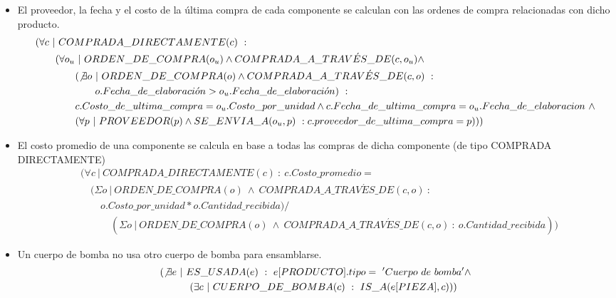 \documentclass[]{report}
\begin{document}
\begin{itemize}
		\item El proveedor, la fecha y el costo de la última compra de cada componente se calculan con las ordenes de compra relacionadas con dicho producto.
		\begin{align*}
		&(\forall c\ |\ COMPRADA\_DIRECTAMENTE(c)\ :\\
		&\hspace{2em} (\forall o_u\ |\ ORDEN\_DE\_COMPRA(o_u) \land  COMPRADA\_A\_TRAV\acute{E}S\_DE(c,o_u) \land\ \\
		&\hspace{4em} (\not \exists o\  |\ ORDEN\_DE\_COMPRA(o) \land  COMPRADA\_A\_TRAV\acute{E}S\_DE(c,o)\ :\\
		&\hspace{6em}o.Fecha\_de\_elaboraci\acute{o}n > o_u.Fecha\_de\_elaboraci\acute{o}n)\ :\\
		&\hspace{4em} c.Costo\_de\_ultima\_compra = o_u.Costo\_por\_unidad \land c.Fecha\_de\_ultima\_compra = o_u.Fecha\_de\_elaboracion\ \land \\
		&\hspace{4em} (\forall p\ |\ PROVEEDOR(p) \land SE\_ENVIA\_A(o_u,p)\ : c.proveedor\_de\_ultima\_compra = p)
		))
		\end{align*}
		
		\item El costo promedio de una componente se calcula en base a todas las compras de dicha componente (de tipo COMPRADA DIRECTAMENTE)
		\begin{align*}
		&(\forall c\ |\ COMPRADA\_DIRECTAMENTE(c)\ :\ c.Costo\_promedio =\\
		&\hspace{1em} (\Sigma o\ |\ ORDEN\_DE\_COMPRA(o)\ \land\ COMPRADA\_A\_TRAV\acute{E}S\_DE(c,o)\ : \\
		& \hspace{2em} o.Costo\_por\_unidad*o.Cantidad\_recibida)/\\
		& \hspace{3em} (\Sigma o\ |\ ORDEN\_DE\_COMPRA(o)\ \land\ COMPRADA\_A\_TRAV\acute{E}S\_DE(c,o)\ :\ o.Cantidad\_recibida))
		\end{align*}
		
		
		\item Un cuerpo de bomba no usa otro cuerpo de bomba para ensamblarse.
		\begin{align*}
		&(\not \exists e\ |\ ES\_USADA(e)\ :\ e[PRODUCTO].tipo =\ 'Cuerpo\ de\ bomba' \land \\
		&\hspace{3em}(\exists c\ |\ CUERPO\_DE\_BOMBA(c)\ :\ IS\_A(e[PIEZA], c)))
		\end{align*}
		

\end{itemize}
\end{document}
